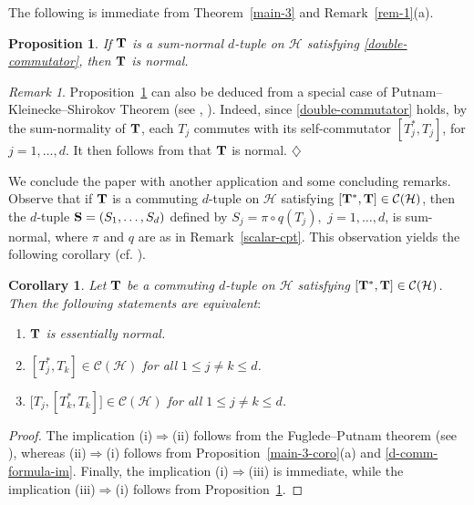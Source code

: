 \documentclass[10pt, a4paper, oneside, reqno]{amsproc}
\numberwithin{equation}{section}
\newtheorem{proposition}[theorem]{Proposition}
\newtheorem{corollary}[theorem]{Corollary}
\theoremstyle{remark}
\newtheorem{remark}[theorem]{Remark}
\theoremstyle{definition}
\newcommand*{\Le}{\leqslant}
\begin{document}
The following is immediate from Theorem~\ref{main-3} and Remark~\ref{rem-1}(a).
\begin{proposition}
\label{sum-normal-to-normal}
 If ${\bf T}$ is a sum-normal $d$-tuple on $\mathcal H$ satisfying \eqref{double-commutator}, 
then ${\bf T}$ is normal. 
\end{proposition}
\begin{remark} 
Proposition~\ref{sum-normal-to-normal} can also be deduced from a  special case of Putnam--Kleinecke--Shirokov Theorem (see \cite[pp.~129-130]{P1954}, \cite[Problem~232]{H1967}). Indeed, since \eqref{double-commutator} holds, by the sum-normality of ${\bf T}$, each $T_j$ commutes with its self-commutator $[T^*_j, T_j]$, for $j=1, \ldots, d$. It then follows from \cite[Corollary, pp.~929--930]{P1954} that ${\bf T}$ is normal. 
\hfill $\diamondsuit$
\end{remark}


We conclude the paper with 
another application 
and some concluding remarks. Observe that if ${\bf T}$ is a commuting $d$-tuple on $\mathcal H$ satisfying $[{\bf T}^*, {\bf T}] \in \mathcal C(\mathcal H)$, then 
the $d$-tuple ${\bf S}=(S_1, \ldots, S_d)$ defined by 
$S_j=\pi \circ q(T_j),$ $j=1, \ldots, d$, is sum-normal, where $\pi$ and $q$ are as in Remark~\ref{scalar-cpt}. 
This observation yields the following corollary (cf. \cite[Lemma~2.11]{MPS2022}).
\begin{corollary} \label{coro-single}
Let ${\bf T}$ be a commuting $d$-tuple on $\mathcal H$ satisfying $[{\bf T}^*, {\bf T}] \in \mathcal C(\mathcal H)$. Then the following statements are equivalent$:$
\begin{enumerate}
\item[(i)] ${\bf T}$ is essentially normal.
\item[(ii)] $[T^*_j, T_k] \in {\mathcal C}(\mathcal H)$ for all $1 \Le j \neq k \Le d$. 
\item[(iii)] $\big[T_j, [T^*_k, T_k]\big] \in {\mathcal C}(\mathcal H)$ for all $1 \Le j  \neq k \Le d$. 
\end{enumerate}  
\end{corollary}

\begin{proof} The implication (i)$\Rightarrow$(ii) follows from the Fuglede--Putnam theorem (see \cite[Corollary~1.18]{RR1973}), whereas (ii)$\Rightarrow$(i) follows from Proposition~\ref{main-3-coro}(a) and \eqref{d-comm-formula-im}. Finally, the implication (i)$\Rightarrow$(iii) is immediate, while the implication (iii)$\Rightarrow$(i) follows from Proposition~\ref{sum-normal-to-normal}.
\end{proof}
\end{document}
